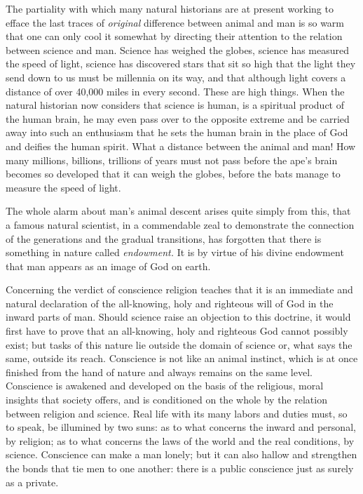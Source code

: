 \documentclass[12pt,a4paper,openany]{book}
\newcommand{\opage}[1]{\marginnote{\footnotesize\textit{[#1]}}}
\begin{document}
The partiality with which many natural historians
are at present working to efface the last traces of
\emph{original} difference between animal and man is so
warm that one can only cool it somewhat by directing
their attention to the relation between
science and man. Science has weighed
the globes, science has measured the speed of light,
science has discovered stars that sit so high
that the light they send down to us must be millennia
on its way, and that although light covers a distance of
over 40,000 miles in every second. These are high things.
When the natural historian now considers that science is
human, is a spiritual product of the human
brain, he may even pass over to the opposite
extreme and be carried away into such an enthusiasm that
he sets the human brain in the place of God and deifies
the human spirit. What a distance between
the animal and man! How many millions, billions, trillions of
years must not pass before the ape's
brain becomes so developed that it can weigh the globes,
before the bats manage to measure the speed of
light.

The whole alarm about man's animal descent
arises quite simply from this, that a famous
natural scientist, in a commendable zeal to demonstrate
the connection of the generations and the gradual transitions,
has forgotten that there is something in nature called
\emph{endowment.} It is by virtue of his divine endowment that
\setcounter{footnote}{0}%
\opage{65}man appears as an image of God on
earth.

Concerning the verdict of conscience religion teaches that it
is an immediate and natural declaration of the
all-knowing, holy and righteous will of God in the inward
parts of man. Should science raise an objection to this
doctrine, it would first have to prove that an all-knowing,
holy and righteous God cannot possibly exist; but tasks
of this nature lie outside the domain of science
or, what says the same, outside
its reach. Conscience is not like
an animal instinct, which is at once finished from
the hand of nature and always remains on the same level.
Conscience is awakened and developed on the basis
of the religious, moral insights that society offers,
and is conditioned on the whole by the relation between religion
and science. Real life with its many labors
and duties must, so to speak, be illumined by two suns:
as to what concerns the inward and personal, by religion; as to what
concerns the laws of the world and the real conditions, by science.
Conscience can make a man lonely;
but it can also hallow and strengthen the bonds that tie
men to one another: there is a public conscience just as surely
as a private.
\end{document}
